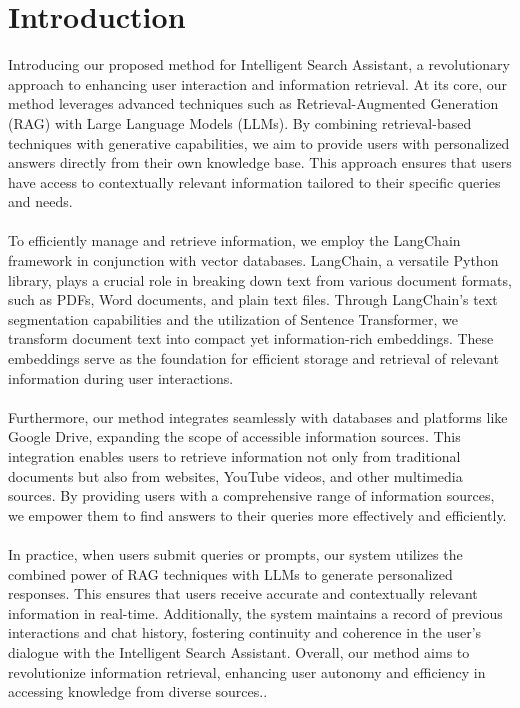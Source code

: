\documentclass[12pt,a4paper,oneside]{report}
\begin{document}
\newpage
{}
\chapter{Introduction}

\hspace{1cm}Introducing our proposed method for Intelligent Search Assistant, a revolutionary approach to enhancing user interaction and information retrieval. At its core, our method leverages advanced techniques such as Retrieval-Augmented Generation (RAG) with Large Language Models (LLMs). By combining retrieval-based techniques with generative capabilities, we aim to provide users with personalized answers directly from their own knowledge base. This approach ensures that users have access to contextually relevant information tailored to their specific queries and needs.\\
\\
\hspace{1cm}    To efficiently manage and retrieve information, we employ the LangChain framework in conjunction with vector databases. LangChain, a versatile Python library, plays a crucial role in breaking down text from various document formats, such as PDFs, Word documents, and plain text files. Through LangChain's text segmentation capabilities and the utilization of Sentence Transformer, we transform document text into compact yet information-rich embeddings. These embeddings serve as the foundation for efficient storage and retrieval of relevant information during user interactions.\\
\\
\hspace{1cm}Furthermore, our method integrates seamlessly with databases and platforms like Google Drive, expanding the scope of accessible information sources. This integration enables users to retrieve information not only from traditional documents but also from websites, YouTube videos, and other multimedia sources. By providing users with a comprehensive range of information sources, we empower them to find answers to their queries more effectively and efficiently. \\
\\
\hspace{1cm}In practice, when users submit queries or prompts, our system utilizes the combined power of RAG techniques with LLMs to generate personalized responses. This ensures that users receive accurate and contextually relevant information in real-time. Additionally, the system maintains a record of previous interactions and chat history, fostering continuity and coherence in the user's dialogue with the Intelligent Search Assistant. Overall, our method aims to revolutionize information retrieval, enhancing user autonomy and efficiency in accessing knowledge from diverse sources..\\
\end{document}
